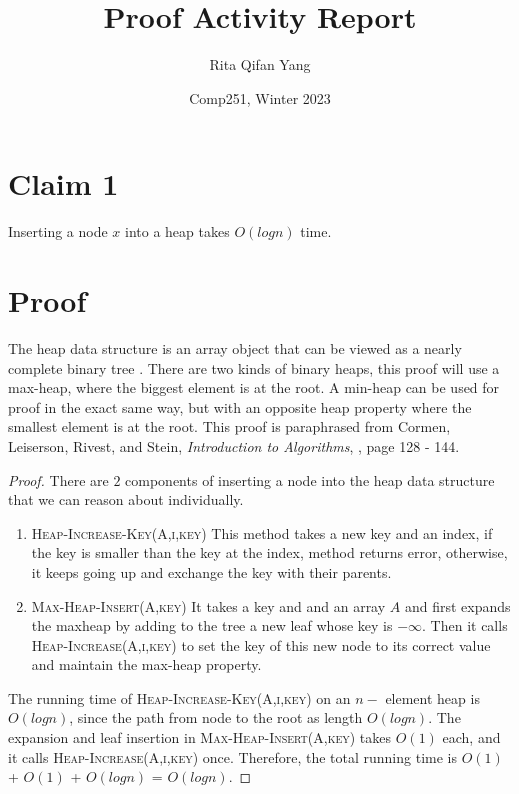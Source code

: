 \documentclass[12pt]{article}
\title{Proof Activity Report}
\author{Rita Qifan Yang }
\date{Comp251, Winter 2023}
\begin{document}
\maketitle

\section*{Claim 1}
Inserting a node $x$ into a heap takes $O(logn)$ time. 


\section*{Proof}
The heap data structure is an array object that can be viewed as a nearly complete binary tree \cite{cormen2009introduction}. There are two kinds of binary heaps, this proof will use a max-heap, where the biggest element is at the root. A min-heap can be used for proof in the exact same way, but with an opposite heap property where the smallest element is at the root. This proof is paraphrased from Cormen, Leiserson, Rivest, and Stein, \textit{Introduction to Algorithms}, \cite{cormen2009introduction}, page 128 - 144. 
\begin{proof}
There are $2$ components of inserting a node into the heap data structure that we can reason about individually.
\begin{enumerate}
    \item \textsc{Heap-Increase-Key(A,i,key)}
    This method takes a new key and an index, if the key is smaller than the key at the index, method returns error, otherwise, it keeps going up and exchange the key with their parents. 
    \item \textsc{Max-Heap-Insert(A,key)} 
    It takes a key and and an array $A$ and first expands the maxheap by adding to the tree a new leaf whose key is $ - \infty$. Then it calls \textsc{Heap-Increase(A,i,key)} to set the key of this new node to its correct value and maintain the max-heap property.
    
\end{enumerate}
The running time of \textsc{Heap-Increase-Key(A,i,key)} on an $n-$ element heap is $O(logn)$, since the path from node to the root as length $O(logn)$. The expansion and leaf insertion in \textsc{Max-Heap-Insert(A,key)} takes $O(1)$ each, and it calls  \textsc{Heap-Increase(A,i,key)} once. Therefore, the total running time is $O(1)$ + $O(1)$ + $O(log n)$ = $O(logn)$. 

\end{proof}
\end{document}
